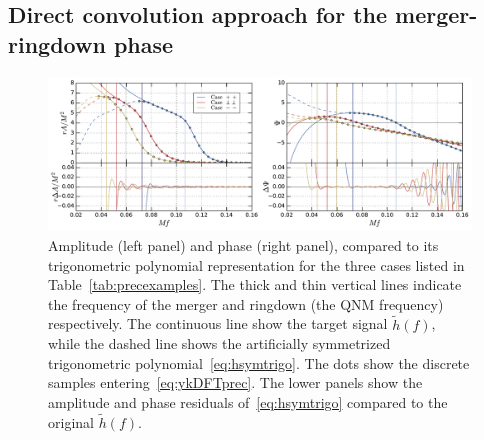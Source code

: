 \documentclass[aps,showpacs,twocolumn,
prd,superscriptaddress,nofootinbib]{revtex4-1}
\begin{document}


\subsection{Direct convolution approach for the merger-ringdown phase}
\label{subsec:trigopoly}

\begin{figure}
  \centering
  \includegraphics[width=.98\linewidth]{plots/trigopoly_py.pdf}
  \caption{Amplitude (left panel) and phase (right panel), compared to its trigonometric polynomial representation for the three cases listed in Table~\ref{tab:precexamples}. The thick and thin vertical lines indicate the frequency of the merger and ringdown (the QNM frequency) respectively. The continuous line show the target signal $\tilde{h}(f)$, while the dashed line shows the artificially symmetrized trigonometric polynomial~\eqref{eq:hsymtrigo}. The dots show the discrete samples entering~\eqref{eq:ykDFTprec}. The lower panels show the amplitude and phase residuals of~\eqref{eq:hsymtrigo} compared to the original $\tilde{h}(f)$.}
  \label{fig:trigopoly}
\end{figure}
\end{document}
